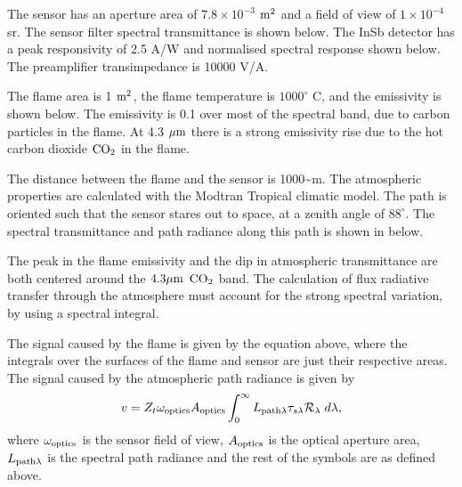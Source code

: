 \documentclass[a4paper,10pt,english]{sphinxmanual}
\begin{document}
The sensor has an aperture area of \(7.8 \times 10^{-3}\) \({\rm m}^2\)
and  a field of view of \(1 \times 10^{-4}\) sr. The sensor filter spectral
transmittance is shown below. The InSb detector has a peak responsivity of 2.5
A/W and normalised spectral response shown below. The preamplifier transimpedance
is 10000 V/A.

The flame area is  1 \({\rm m}^2\), the flame temperature is
\(1000^\circ\) C, and the emissivity is shown below. The emissivity
is 0.1 over most of the spectral band, due to carbon particles in the flame.
At 4.3 \(\mu{\rm m}\) there is a strong emissivity rise due to the hot
carbon dioxide \({\rm CO}_2\) in the flame.

The distance between the flame and the sensor is 1000\textasciitilde{}m. The atmospheric
properties are calculated with the Modtran Tropical climatic model. The
path is oriented such that the sensor stares out to space, at a zenith angle
of \(88^\circ\). The spectral transmittance and path radiance along this
path is shown in below.

The peak in the flame emissivity and the dip in atmospheric transmittance are
both centered around the \(4.3\mu{\rm m}\) \({\rm CO}_2\) band. The calculation
of flux
radiative transfer through the atmosphere must account for the strong spectral
variation, by using a spectral integral.

The signal caused by the flame is given by the equation above, where the
integrals over the surfaces of the flame and sensor are just their respective
areas. The signal caused by the atmospheric path radiance is given by
\begin{gather}
\begin{split}v=
Z_t
\omega_{\rm optics}
A_{\rm optics}
\int_0^\infty
L_{{\rm path}\lambda}
\tau_{s\lambda}{\cal R}_\lambda
\;d\lambda,\end{split}\notag
\end{gather}
where
\(\omega_{\rm optics}\) is the sensor field of view,
\(A_{\rm optics}\) is the optical aperture area,
\(L_{{\rm path}\lambda}\) is the spectral path radiance
and the rest of the symbols are as defined above.

{\hfill{}\hfill}
\end{document}
